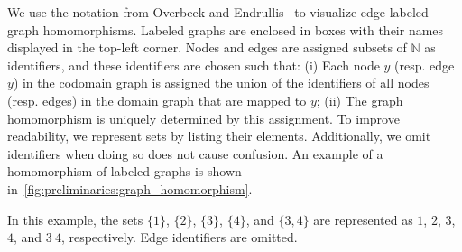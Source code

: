 \begin{notation}
    \label{notation:graph_homomorphism}
    We use the notation from Overbeek and Endrullis~\cite[Notation 1]{overbeek2023apbpotutorial} to visualize edge-labeled graph homomorphisms. Labeled graphs are enclosed in boxes with their names displayed in the top-left corner. Nodes and edges are assigned subsets of \(\mathbb{N}\) as identifiers, and these identifiers are chosen such that: (i) Each node \( y \) (resp. edge \( y \)) in the codomain graph is assigned the union of the identifiers of all nodes (resp. edges) in the domain graph that are mapped to \( y \); (ii) The graph homomorphism is uniquely determined by this assignment. To improve readability, we represent sets by listing their elements. Additionally, we omit identifiers when doing so does not cause confusion. An example of a homomorphism of labeled graphs is shown in~\autoref{fig:preliminaries:graph_homomorphism}.
    
    \begin{figure}[H]
        \centering
    \caption{}
    \label{fig:preliminaries:graph_homomorphism}
    \end{figure}
    In this example, the sets \(\{1\}\), \(\{2\}\), \(\{3\}\), \(\{4\}\), and \(\{3,4\}\) are represented as \(1\), \(2\), \(3\), \(4\), and \(3\ 4\), respectively. Edge identifiers are omitted.
\end{notation} 


